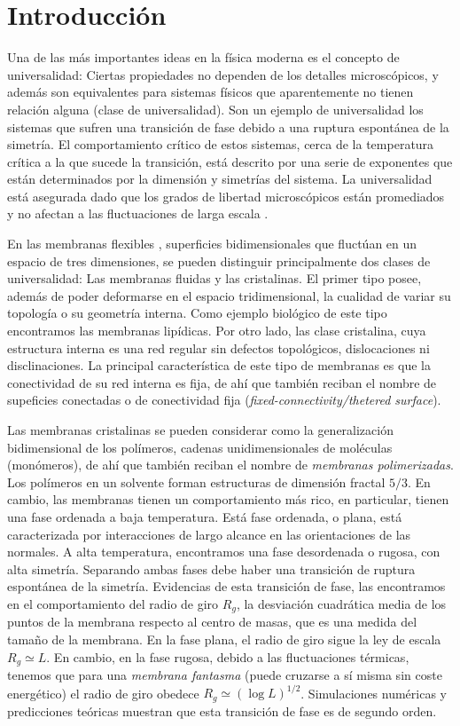 \chapter{Introducción}

Una de las más importantes ideas en la física moderna es el concepto de
universalidad: Ciertas propiedades no dependen de los
detalles microscópicos, y además son equivalentes para sistemas
físicos que aparentemente no tienen relación alguna (clase de universalidad). Son un ejemplo de universalidad los sistemas que sufren una transición de fase debido a una ruptura
espontánea de la simetría. El comportamiento crítico de estos sistemas, cerca
de la temperatura crítica a la que sucede la transición, está descrito por una
serie de exponentes que están determinados por la dimensión y simetrías del
sistema. La universalidad está asegurada dado que los grados de libertad
microscópicos están promediados y no afectan a las fluctuaciones de larga
escala \cite{Kay:Polimerized_Membranes}. 

En las membranas flexibles \cite{Bowick_flat_phase}, superficies bidimensionales que fluctúan en un
espacio de tres dimensiones, se pueden distinguir principalmente dos clases de
universalidad: Las membranas fluidas y las cristalinas. El primer tipo posee, además de poder
deformarse en el espacio tridimensional, la cualidad de variar su topología o
su geometría interna. Como ejemplo biológico de este tipo encontramos las
membranas lipídicas. Por otro lado, las clase cristalina, cuya estructura
interna es una red regular sin defectos topológicos, dislocaciones ni disclinaciones.  
 La principal característica de este tipo de membranas es que la conectividad
de su red interna es fija, de ahí que también reciban el nombre de supeficies
conectadas o de conectividad fija (\textit{fixed-connectivity/thetered surface}).  

Las membranas cristalinas se pueden considerar como la
generalización bidimensional de los polímeros, cadenas unidimensionales
de moléculas (monómeros), de ahí que también reciban el nombre de
\textit{membranas polimerizadas}. Los polímeros en un solvente forman
estructuras de dimensión fractal $5/3$. En cambio, las membranas tienen un
comportamiento más rico, en particular, tienen una fase ordenada a baja
temperatura. Está fase ordenada, o plana, está caracterizada por interacciones
de largo alcance en las orientaciones de las normales. A alta temperatura,
encontramos una fase desordenada o rugosa, con alta simetría. Separando ambas fases debe haber
una transición de ruptura espontánea de la simetría. Evidencias de esta
transición de fase, las encontramos en el comportamiento del radio de giro
$R_g$, la desviación cuadrática media de los puntos de la membrana respecto
al centro de masas, que es una medida del tamaño de la membrana. En la fase
plana, el radio de giro sigue la ley de escala $R_g\simeq L$. En cambio,
en la fase rugosa, debido a las fluctuaciones térmicas, tenemos que para una \textit{membrana
fantasma} (puede cruzarse a sí misma sin coste energético) el radio de giro
obedece $R_g\simeq (\log L)^{1/2}$. Simulaciones numéricas \cite{Bowick_flat_phase}\cite{Espriu:MCRG}
y predicciones teóricas \cite{Doussal:nu} muestran que esta transición de fase es de segundo orden.

